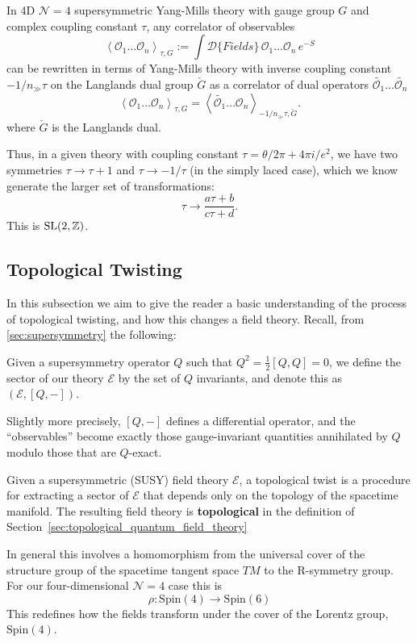 	\begin{concept}
		In 4D $\mathcal N = 4$ supersymmetric Yang-Mills theory with gauge group $G$ and complex coupling constant $\tau$, any correlator of observables
		\[
			\left< \mathcal O_1 \dots \mathcal O_n \right>_{\tau, G} := \int \mathcal{D}\{ Fields \}\, \mathcal O_1 \dots \mathcal O_n \, e^{-S}
		\]
		can be rewritten in terms of Yang-Mills theory with inverse coupling constant $-1/n_{\gg} \tau$ on the Langlands dual group $\check G$ as a correlator of dual operators $\tilde {\mathcal O_1} \dots \tilde {\mathcal O_n}$
		\[
			\left< \mathcal O_1 \dots \mathcal O_n \right>_{\tau, G} = \left< \tilde{\mathcal O_1} \dots \mathcal O_n \right>_{-1/n_\gg \tau, \check G}.
		\]
		where $\check G$ is the Langlands dual.
	\end{concept}
	
	Thus, in a given theory with coupling constant $\tau = \theta/2\pi + 4\pi i/e^2$, we have two symmetries $\tau \to \tau+1$ and $\tau \to -1/\tau$ (in the simply laced case), which we know generate the larger set of transformations:
	\[
		\tau \to \frac{a \tau + b}{c \tau + d}.
	\]
	This is $\mathrm{SL}(2, \mathbb{Z})$.
	

\subsection{Topological Twisting} %
\label{sub:topological_twisting}

	In this subsection we aim to give the reader a basic understanding of the process of topological twisting, and how this changes a field theory. Recall, from \ref{sec:supersymmetry} the following:
	\begin{phys}[Sector]
		Given a supersymmetry operator $Q$ such that $Q^2 = \frac{1}{2} [Q, Q] = 0$, we define the sector of our theory $\mathcal E$ by the set of $Q$ invariants, and denote this as $(\mathcal E, [Q, -])$.
		
		Slightly more precisely, $[Q, -]$ defines a differential operator, and the ``observables'' become exactly those gauge-invariant quantities annihilated by $Q$ modulo those that are $Q$-exact.
	\end{phys}
	
	
	\begin{phys}
		Given a supersymmetric (SUSY) field theory $\mathcal E$, a topological twist is a procedure for extracting a sector of $\mathcal E$ that depends only on the topology of the spacetime manifold. The resulting field theory is \textbf{topological} in the definition of Section~\ref{sec:topological_quantum_field_theory}
	\end{phys}
	In general this involves a homomorphism from the universal cover of the structure group of the spacetime tangent space $TM$ to the R-symmetry group. For our four-dimensional $\mathcal N = 4$ case this is
	$$\rho : \mathrm{Spin}(4) \to \mathrm{Spin}(6)$$
	This redefines how the fields transform under the cover of the Lorentz group, $\mathrm{Spin}(4)$. 
	
